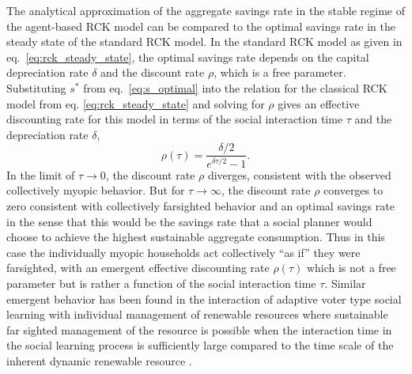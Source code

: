 The analytical approximation of the aggregate savings rate in the stable regime of the agent-based RCK model can be compared to the optimal savings rate in the steady state of the standard RCK model. In the standard RCK model as given in eq.~\eqref{eq:rck_steady_state}, the optimal savings rate depends on the capital depreciation rate $\delta$ and the discount rate $\rho$, which is a free parameter. Substituting $s^\ast$ from eq.~\eqref{eq:s_optimal} into the relation for the classical RCK model from eq. \eqref{eq:rck_steady_state} and solving for $\rho$ gives an effective discounting rate for this model in terms of the social interaction time $\tau$ and the depreciation rate $\delta$,
\begin{equation}
   \rho(\tau) = \frac{\delta/2}{e^{\delta \tau/2} - 1}. \label{eq:rhotau}
\end{equation}
In the limit of $\tau \to 0$, the discount rate $\rho$ diverges, consistent with the observed collectively myopic behavior. But for $\tau \to \infty$, the discount rate $\rho$ converges to zero consistent with collectively farsighted behavior and an optimal savings rate in the sense that this would be the savings rate that a social planner would choose to achieve the highest sustainable aggregate consumption. Thus in this case the individually myopic households act collectively ``as if'' they were farsighted, with an emergent effective discounting rate $\rho(\tau)$ which is not a free parameter but is rather a function of the social interaction time $\tau$. Similar emergent behavior has been found in the interaction of adaptive voter type social learning with individual management of renewable resources where sustainable far sighted management of the resource is possible when the interaction time in the social learning process is sufficiently large compared to the time scale of the inherent dynamic renewable resource \citep{Wiedermann2015}. 


